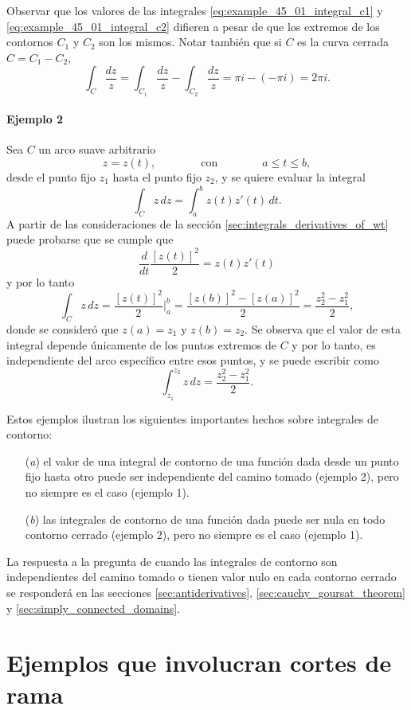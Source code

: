 \documentclass[a4paper]{report}
\begin{document}
Observar que los valores de las integrales \ref{eq:example_45_01_integral_c1} y \ref{eq:example_45_01_integral_c2} difieren a pesar de que los extremos de los contornos \(C_1\) y \(C_2\) son los mismos. Notar también que si \(C\) es la curva cerrada \(C=C_1-C_2\),
\[
 \int_C\frac{dz}{z}=\int_{C_1}\frac{dz}{z}-\int_{C_2}\frac{dz}{z}=\pi i-(-\pi i)=2\pi i.
\]

\paragraph{Ejemplo 2} Sea \(C\) un arco suave arbitrario
\[
 z=z(t),\qquad\qquad\textrm{con}\qquad\qquad a\leq t\leq b,
\]
desde el punto fijo \(z_1\) hasta el punto fijo \(z_2\), y se quiere evaluar la integral
\[
 \int_C z\,dz=\int_a^bz(t)z'(t)\,dt.
\]
A partir de las consideraciones de la sección \ref{sec:integrals_derivatives_of_wt} puede probarse que se cumple que 
\[
 \frac{d}{dt}\frac{[z(t)]^2}{2}=z(t)z'(t)
\]
y por lo tanto
\[
 \int_C z\,dz=\frac{[z(t)]^2}{2}\bigg|_a^b=\frac{[z(b)]^2-[z(a)]^2}{2}=\frac{z_2^2-z_1^2}{2},
\]
donde se consideró que \(z(a)=z_1\) y \(z(b)=z_2\). Se observa que el valor de esta integral depende únicamente de los puntos extremos de \(C\) y por lo tanto, es independiente del arco específico entre esos puntos, y se puede escribir como
\[
 \int_{z_1}^{z_2}z\,dz=\frac{z_2^2-z_1^2}{2}.
\]

Estos ejemplos ilustran los siguientes importantes hechos sobre integrales de contorno:
\begin{enumerate}
 \item[(\textit{a})] el valor de una integral de contorno de una función dada desde un punto fijo hasta otro puede ser independiente del camino tomado (ejemplo 2), pero no siempre es el caso (ejemplo 1).
 \item[(\textit{b})] las integrales de contorno de una función dada puede ser nula en todo contorno cerrado (ejemplo 2), pero no siempre es el caso (ejemplo 1).
\end{enumerate}

La respuesta a la pregunta de cuando las integrales de contorno son independientes del camino tomado o tienen valor nulo en cada contorno cerrado se responderá en las secciones \ref{sec:antiderivatives}, \ref{sec:cauchy_goursat_theorem} y \ref{sec:simply_connected_domains}. 

\section{Ejemplos que involucran cortes de rama}\label{sec:integrals_examples_with_branch_cuts}
\end{document}
